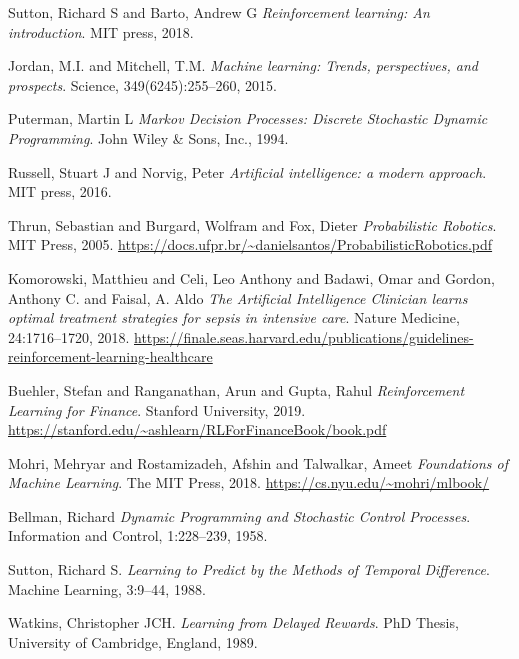 \newpage
{}
\begin{thebibliography}{99}


Sutton, Richard S and Barto, Andrew G \textit{Reinforcement learning: An introduction}. MIT press, 2018.

Jordan, M.I. and Mitchell, T.M. \textit{Machine learning: Trends, perspectives, and prospects}. Science, 349(6245):255--260, 2015.

Puterman, Martin L \textit{Markov Decision Processes: Discrete Stochastic Dynamic Programming}. John Wiley \& Sons, Inc., 1994.

Russell, Stuart J and Norvig, Peter \textit{Artificial intelligence: a modern approach}. MIT press, 2016.


Thrun, Sebastian and Burgard, Wolfram and Fox, Dieter \textit{Probabilistic Robotics}. MIT Press, 2005. \url{https://docs.ufpr.br/~danielsantos/ProbabilisticRobotics.pdf}


Komorowski, Matthieu and Celi, Leo Anthony and Badawi, Omar and Gordon, Anthony C. and Faisal, A. Aldo \textit{The Artificial Intelligence Clinician learns optimal treatment strategies for sepsis in intensive care}. Nature Medicine, 24:1716–1720, 2018. \url{https://finale.seas.harvard.edu/publications/guidelines-reinforcement-learning-healthcare}



Buehler, Stefan and Ranganathan, Arun and Gupta, Rahul \textit{Reinforcement Learning for Finance}. Stanford University, 2019. \url{https://stanford.edu/~ashlearn/RLForFinanceBook/book.pdf}


Mohri, Mehryar and Rostamizadeh, Afshin and Talwalkar, Ameet \textit{Foundations of Machine Learning}. The MIT Press, 2018. \url{https://cs.nyu.edu/~mohri/mlbook/}


Bellman, Richard \textit{Dynamic Programming and Stochastic Control Processes}. Information and Control, 1:228--239, 1958.

Sutton, Richard S. \textit{Learning to Predict by the Methods of Temporal Difference}. Machine Learning, 3:9--44, 1988.

Watkins, Christopher JCH. \textit{Learning from Delayed Rewards}. PhD Thesis, University of Cambridge, England, 1989.






\end{thebibliography}
